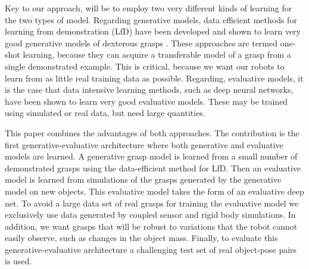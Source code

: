 Key to our approach, will be to employ two very different kinds of learning for the two types of model. Regarding generative models, data efficient methods for learning from demonstration (LfD) have been developed and shown to learn very good generative models of dexterous grasps \cite{kopicki2015ijrr}. These approaches are termed one-shot learning, because they can acquire a transferable model of a grasp from a single demonstrated example. This is critical, because we want our robots to learn from as little real training data as possible. Regarding, evaluative models, it is the case that data intensive learning methods, such as deep neural networks, have been shown to learn very good evaluative models. These may be trained using simulated or real data, but need large quantities. 

This paper combines the advantages of both approaches. The contribution is the first generative-evaluative architecture where both generative and evaluative models are learned. A generative grasp model is learned from a small number of demonstrated grasps using the data-efficient method for LfD. Then an evaluative model is learned from simulations of the grasps generated by the generative model on new objects. This evaluative model takes the form of an evaluative deep net. To avoid a large data set of real grasps for training the evaluative model we exclusively use data generated by coupled sensor and rigid body simulations. In addition, we want grasps that will be robust to variations that the robot cannot easily observe, such as changes in the object mass.
Finally, to evaluate this generative-evaluative architecture a challenging test set of real object-pose pairs is used. 

